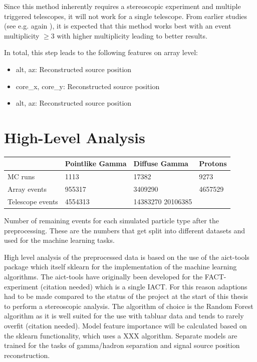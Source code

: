 Since this method inherently requires a stereoscopic experiment
and multiple triggered telescopes, it will not work for a single telescope.
From earlier studies (see e.g. again \cite{kai_diss}), it is expected
that this method works best with an event multiplicity 
$\geq 3$ with higher multiplicity leading to better results.

In total, this step leads to the following features on array level:
\begin{itemize}
    \item{alt, az: Reconstructed source position}
    \item{core_x, core_y: Reconstructed source position}
    \item{alt, az: Reconstructed source position}
\end{itemize}

\section{High-Level Analysis}

\begin{center}
    \begin{tabular}{| l | l | l | l |}
    \hline
     & Pointlike Gamma & Diffuse Gamma & Protons \\
    \hline
    MC runs & \num{1113} & \num{17382} &  \num{9273} \\ 
    \hline
    Array events & \num{955317} & \num{3409290} & \num{4657529} \\
    \hline
    Telescope events & \num{4554313} & \num{14383270} \num{20106385} & 
    \end{tabular}
    \caption{Number of remaining events for each simulated particle type after the
    preprocessing. These are the numbers that get split into different datasets 
    and used for the machine learning tasks.}
    \label{tab:events_after_prep}
\end{center}


High level analysis of the preprocessed data is based on the use of
the aict-tools \cite{aict-tools} package which itself 
sklearn \cite{sklearn_api} for the implementation of the machine learning algorithms.
The aict-tools have originally been developed for the FACT-experiment
(citation needed) which is a single IACT. For this reason
adaptions had to be made compared to the status of the project at the start 
of this thesis to perform a stereoscopic analysis.
The algorithm of choice is the Random Forest algorithm
as it is well suited for the use with tabluar data and tends to rarely overfit
(citation needed).
Model feature importance will be calculated
based on the sklearn functionality, which
uses a XXX algorithm.
Separate models are trained for the tasks of gamma/hadron
separation and signal source position
reconstruction.


